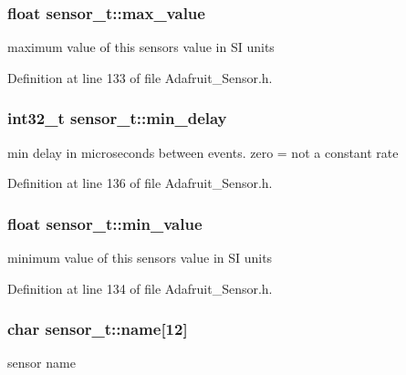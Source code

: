 \subsubsection[{\texorpdfstring{max\+\_\+value}{max\_value}}]{\setlength{\rightskip}{0pt plus 5cm}float sensor\+\_\+t\+::max\+\_\+value}\hypertarget{structsensor__t_a1a17359f1080eb169a452656f7dec1ee}{}\label{structsensor__t_a1a17359f1080eb169a452656f7dec1ee}
maximum value of this sensor\textquotesingle{}s value in SI units 

Definition at line 133 of file Adafruit\+\_\+\+Sensor.\+h.

\subsubsection[{\texorpdfstring{min\+\_\+delay}{min\_delay}}]{\setlength{\rightskip}{0pt plus 5cm}int32\+\_\+t sensor\+\_\+t\+::min\+\_\+delay}\hypertarget{structsensor__t_a1cd271377ff25ec9ca54886f876c87ec}{}\label{structsensor__t_a1cd271377ff25ec9ca54886f876c87ec}
min delay in microseconds between events. zero = not a constant rate 

Definition at line 136 of file Adafruit\+\_\+\+Sensor.\+h.

\subsubsection[{\texorpdfstring{min\+\_\+value}{min\_value}}]{\setlength{\rightskip}{0pt plus 5cm}float sensor\+\_\+t\+::min\+\_\+value}\hypertarget{structsensor__t_a4556ed82a0389a7f6af25a6fd0ee1431}{}\label{structsensor__t_a4556ed82a0389a7f6af25a6fd0ee1431}
minimum value of this sensor\textquotesingle{}s value in SI units 

Definition at line 134 of file Adafruit\+\_\+\+Sensor.\+h.

\subsubsection[{\texorpdfstring{name}{name}}]{\setlength{\rightskip}{0pt plus 5cm}char sensor\+\_\+t\+::name\mbox{[}12\mbox{]}}\hypertarget{structsensor__t_a4383b68d36f9dc4096d83583c3b009bf}{}\label{structsensor__t_a4383b68d36f9dc4096d83583c3b009bf}
sensor name 

